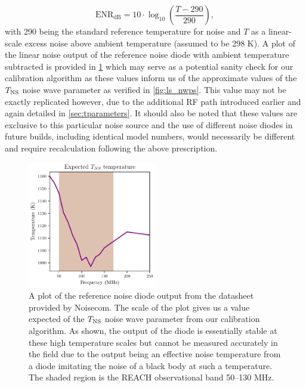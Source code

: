 \begin{equation}
    \mathrm{ENR_{dB}} = 10 \cdot \log_{10} \left( \frac{T - 290}{290}\right),
\end{equation}
with 290 being the standard reference temperature for noise and $T$ as a linear-scale excess noise above ambient temperature (assumed to be 298 K). A plot of the linear noise output of the reference noise diode with ambient temperature subtracted is provided in \cref{fig:ns_diode} which may serve as a potential sanity check for our calibration algorithm as these values inform us of the approximate values of the $T_{\mathrm{NS}}$ noise wave parameter as verified in \cref{fig:ls_nwps}. This value may not be exactly replicated however, due to the additional RF path introduced earlier and again detailed in \cref{sec:tparameters}. It should also be noted that these values are exclusive to this particular noise source and the use of different noise diodes in future builds, including identical model numbers, would necessarily be different and require recalculation following the above prescription.
\begin{figure}
    \centering
    \includegraphics[width=0.5\textwidth]{ns_diode}
    \caption{A plot of the reference noise diode output from the datasheet provided by Noisecom. The scale of the plot gives us a value expected of the $T_{\mathrm{NS}}$ noise wave parameter from our calibration algorithm. As shown, the output of the diode is essentially stable at these high temperature scales but cannot be measured accurately in the field due to the output being an effective noise temperature from a diode imitating the noise of a black body at such a temperature. The shaded region is the REACH observational band 50--130 MHz.}
    \label{fig:ns_diode}
\end{figure}


